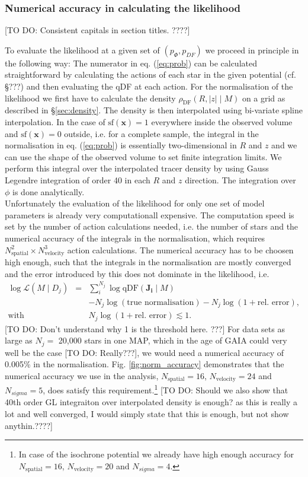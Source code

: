 \documentclass[12pt,preprint]{aastex}
\newcommand{\vect}[1]{\boldsymbol{#1}} %
\begin{document}
\subsubsection{Numerical accuracy in calculating the likelihood}
[TO DO: Consistent capitals in section titles. ????]

To evaluate the likelihood at a given set of $(p_\Phi,p_{DF})$ we proceed in principle in the following way: The numerator in eq. (\ref{eq:prob}) can be calculated straightforward by calculating the actions of each star in the given potential (cf. \S ???) and then evaluating the qDF at each action. For the normalisation of the likelihood we first have to calculate the density $\rho_\text{DF}(R,|z| \mid M)$ on a grid as described in \S\ref{sec:density}. The density is then interpolated using bi-variate spline interpolation. In the case of $\text{sf}(\vect{x})=1$ everywhere inside the observed volume and $\text{sf}(\vect{x})=0$ outside, i.e. for a complete sample, the integral in the normalisation in eq. (\ref{eq:prob}) is essentially two-dimensional in $R$ and $z$ and we can use the shape of the observed volume to set finite integration limits. We perform this integral over the interpolated tracer density by using Gauss Legendre integration of order 40 in each $R$ and $z$ direction. The integration over $\phi$ is done analytically.
\\Unfortunately the evaluation of the likelihood for only one set of model parameters is already very computationall expensive. The computation speed is set by the number of action calculations needed, i.e. the number of stars and the numerical accuracy of the integrals in the normalisation, which requires $N_\text{spatial}^2 \times N_\text{velocity}^3$ action calculations. The numerical accuracy has to be choosen high enough, such that the integrals in the normalisation are mostly converged and the error introduced by this does not dominate in the likelihood, i.e.
\begin{eqnarray*}
\log \mathscr{L}(M \mid D_j) &=& \sum_i^{N_j} \log \text{qDF}(\vect{J_i} \mid M) \\
& & -N_j \log(\text{true normalisation}) - N_j \log (1 + \text{rel. error}),\\
 \text{with }  & &N_j \log (1 + \text{rel. error}) \lesssim 1.
\end{eqnarray*}
[TO DO: Don't understand why 1 is the threshold here. ???]
For data sets as large as $N_j =$ 20,000 stars in one MAP, which in the age of GAIA could very well be the case [TO DO: Really???], we would need a numerical accuracy of 0.005\% in the normalisation. Fig. \ref{fig:norm_accuracy} demonstrates that the numerical accuracy we use in the analysis, $N_\text{spatial}=16$, $N_\text{velocity}=24$ and $N_{sigma}=5$, does satisfy this requirement.\footnote{In case of the isochrone potential we already have high enough accuracy for $N_\text{spatial}=16$, $N_\text{velocity}=20$ and $N_{sigma}=4$.} [TO DO: Should we also show that 40th order GL integraiton over interpolated density is enough? as this is really a lot and well converged, I would simply state that this is enough, but not show anythin.????]
\end{document}
